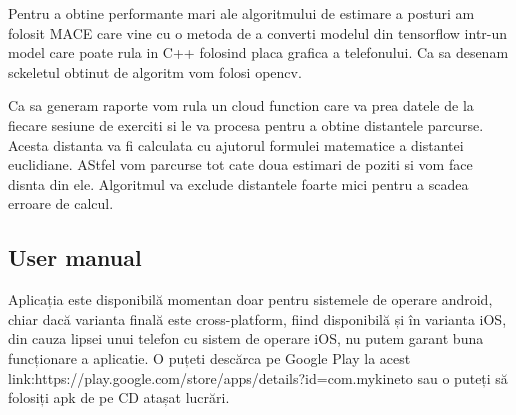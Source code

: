 Pentru a obtine performante mari ale algoritmului de estimare a posturi am folosit MACE care vine cu o metoda de a converti modelul din tensorflow intr-un model care poate rula in C++ folosind placa grafica a telefonului.
Ca sa desenam sckeletul obtinut de algoritm vom folosi opencv. 

Ca sa generam raporte vom rula un cloud function care va prea datele de la fiecare sesiune de exerciti si le va procesa pentru a obtine distantele parcurse.
Acesta distanta va fi calculata cu ajutorul formulei matematice a distantei euclidiane.
AStfel vom parcurse tot cate doua estimari de poziti si vom face disnta din ele. Algoritmul va exclude distantele foarte mici pentru a scadea erroare de calcul.


\subsection{User manual}



Aplicația este disponibilă momentan doar pentru
sistemele de operare android, chiar dacă varianta finală este
cross-platform, fiind disponibilă și în varianta iOS, din cauza
lipsei unui telefon cu sistem de operare iOS, nu putem garant
buna funcționare a aplicatie. O puțeti descărca pe Google Play
la acest link:https://play.google.com/store/apps/details?id=com.mykineto
sau o puteți să folosiți apk de pe CD atașat lucrări.

